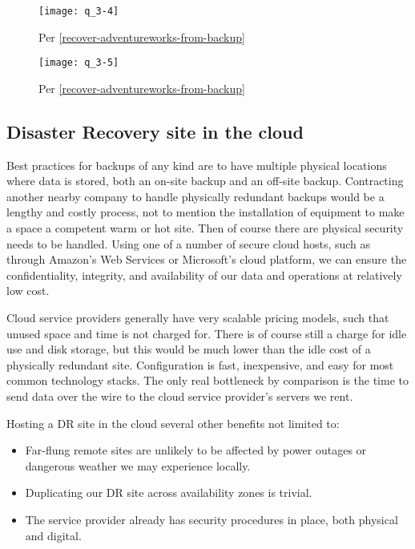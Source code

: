\begin{figure}[H]\centering
	\caption{Per \ref{recover-adventureworks-from-backup}}
	\texttt{[image: q\_3-4]}
	\label{fig:q_3-4}
\end{figure}

\begin{figure}[H]\centering
	\caption{Per \ref{recover-adventureworks-from-backup}}
	\texttt{[image: q\_3-5]}
	\label{fig:q_3-5}
\end{figure}


\hypertarget{disaster-recovery-site-in-the-cloud}{%
\subsection{Disaster Recovery site in the
cloud}\label{disaster-recovery-site-in-the-cloud}}

Best practices for backups of any kind are to have multiple physical
locations where data is stored, both an on-site backup and an off-site
backup. Contracting another nearby company to handle physically
redundant backups would be a lengthy and costly process, not to mention
the installation of equipment to make a space a competent warm or hot
site. Then of course there are physical security needs to be handled.
Using one of a number of secure cloud hosts, such as through Amazon's
Web Services or Microsoft's cloud platform, we can ensure the
confidentiality, integrity, and availability of our data and operations
at relatively low cost.

Cloud service providers generally have very scalable pricing models,
such that unused space and time is not charged for. There is of course
still a charge for idle use and disk storage, but this would be much
lower than the idle cost of a physically redundant site. Configuration
is fast, inexpensive, and easy for most common technology stacks. The
only real bottleneck by comparison is the time to send data over the
wire to the cloud service provider's servers we rent.

Hosting a DR site in the cloud several other benefits not limited to:

\begin{itemize}
\item
  Far-flung remote sites are unlikely to be affected by power outages or
  dangerous weather we may experience locally.
\item
  Duplicating our DR site across availability zones is trivial.
\item
  The service provider already has security procedures in place, both
  physical and digital.
\end{itemize}
